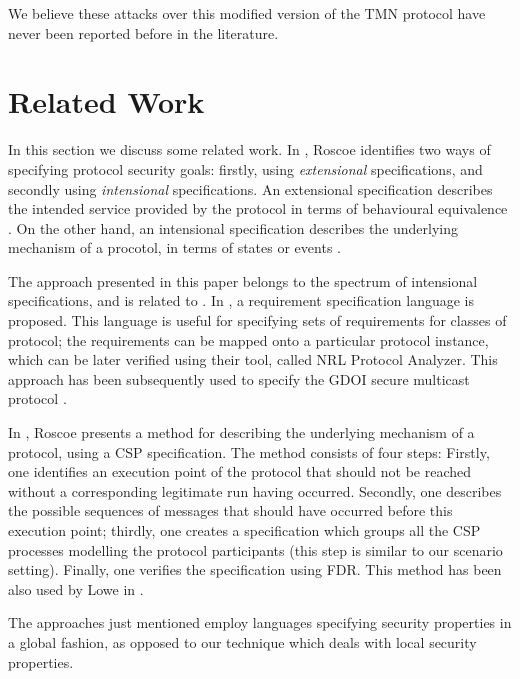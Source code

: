 \documentclass{entcs} \usepackage{entcsmacro}
\begin{document}
We believe these attacks over this modified version of the TMN
protocol have never been reported before in the literature.
\section{Related Work}
\label{sec:relatedwork}

In this section we discuss some related work.  In \cite{Roscoe96},
Roscoe identifies two ways of specifying protocol security goals:
firstly, using \emph{ extensional} specifications, and secondly using
\emph{ intensional} specifications. An extensional specification
describes the intended service provided by the protocol in terms of
behavioural equivalence \cite{FG94,Aba99,schneider96b}. On
the other hand, an intensional specification describes the underlying
mechanism of a procotol, in terms of states or events
\cite{AB01,WL93,Roscoe96,sm96,Pau98,GT02}.

The approach presented in this paper belongs to the spectrum of
intensional specifications, and is related to \cite{Roscoe96,sm96}.
In \cite{sm96}, a requirement specification language is proposed. This
language is useful for specifying sets of requirements for classes of
protocol; the requirements can be mapped onto a particular protocol
instance, which can be later verified using their tool, called NRL
Protocol Analyzer.  This approach has been subsequently used to
specify
the GDOI secure multicast
protocol \cite{meadowsgdoi}.

In \cite{Roscoe96}, Roscoe presents a method for describing the
underlying mechanism of a protocol, using a CSP specification.  The
method consists of four steps: Firstly, one identifies an execution
point of the protocol that should not be reached without a
corresponding legitimate run having occurred.  Secondly, one describes
the possible sequences of messages that should have occurred before
this execution point; thirdly, one creates a specification which
groups all the CSP processes modelling the protocol participants (this
step is similar to our scenario setting).  Finally, one verifies the
specification using FDR.  This method has been also used by Lowe in
\cite{LR97}.

The approaches just mentioned employ languages specifying security
properties in a global fashion, as opposed to our technique which
deals with local security properties.
\end{document}

